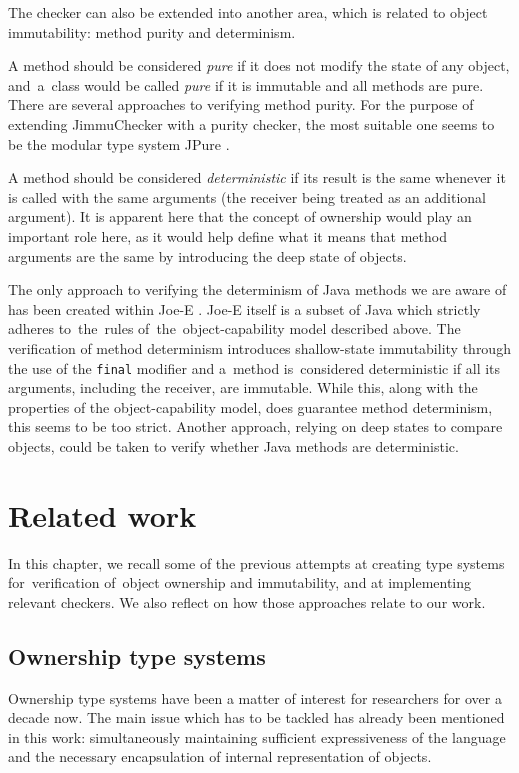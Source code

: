 \documentclass{pracamgr}
\theoremstyle{break}
\theoremstyle{break}
\theoremstyle{break}
\begin{document}
The checker can also be extended into another area, which is related
to object immutability: method purity and determinism. 

A method should be considered \emph{pure} if it does not modify the
state of any object, and~a~class would be called \emph{pure} if it is
immutable and all methods are pure. There are several approaches to
verifying method purity. For the purpose of extending JimmuChecker
with a purity checker, the most suitable one seems to be the modular
type system JPure \cite{jpure}.

A method should be considered \emph{deterministic} if its result is
the same whenever it is called with the same arguments (the receiver
being treated as an additional argument). It is apparent here that the
concept of ownership would play an important role here, as it would
help define what it means that method arguments are the same by
introducing the deep state of objects. 

The only approach to verifying the determinism of Java methods we are
aware of has been created within Joe-E \cite{deterministic}. Joe-E
itself is a subset of Java which strictly adheres to~the~rules
of~the~object-capability model described above. The verification of
method determinism introduces shallow-state immutability through the
use of the \texttt{final} modifier and a~method is~considered
deterministic if all its arguments, including the receiver, are
immutable. While this, along with the properties of the
object-capability model, does guarantee method determinism, this seems
to be too strict. Another approach, relying on deep states to compare
objects, could be taken to verify whether Java methods are
deterministic.

\chapter{Related work}
\label{chap:related}

In this chapter, we recall some of the previous attempts at creating
type systems for~ve\-ri\-fi\-ca\-tion of~object ownership and
immutability, and at implementing relevant checkers. We also reflect
on how those approaches relate to our work.

\section{Ownership type systems}
\label{sec:rel:ownership}

Ownership type systems have been a matter of interest for researchers
for over a decade now. The main issue which has to be tackled has
already been mentioned in this work: simultaneously maintaining
sufficient expressiveness of the language and the necessary
encapsulation of internal representation of objects. 
\end{document}
